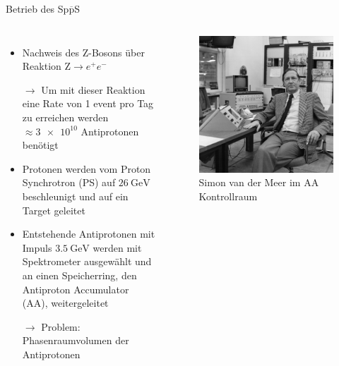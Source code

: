 \documentclass[aspectratio=1610, professionalfonts, 10pt]{beamer}
\begin{document}
\begin{frame}{Betrieb des Sp$\overline{\text{p}}$S}
	\begin{columns}
				\begin{itemize}
					\setlength\itemsep{0.5em}
					\item Nachweis des Z-Bosons über Reaktion $\text{Z} \rightarrow e^+ e^-$
					\item[$\rightarrow$] Um mit dieser Reaktion eine Rate von 1 event pro Tag zu erreichen werden $\approx \num{3e10}$ Antiprotonen benötigt
					\item Protonen werden vom Proton Synchrotron (PS) auf $\SI{26}{\giga\electronvolt}$ beschleunigt und auf ein Target geleitet
					\item Entstehende Antiprotonen mit Impuls $\SI{3.5}{\giga\electronvolt}$ werden mit Spektrometer ausgewählt und an einen Speicherring, den Antiproton Accumulator (AA), weitergeleitet 
					\item[$\rightarrow$] Problem: Phasenraumvolumen der Antiprotonen
				\end{itemize}
			\begin{figure}
	  			\centering
				\includegraphics[width=\linewidth]{Images/8401333.jpg}
				\caption{Simon van der Meer im AA Kontrollraum \cite{CERN-PHOTO-8401333}}
	  			\label{fig:sad}
			\end{figure}
	\end{columns}
\end{frame}
\end{document}
